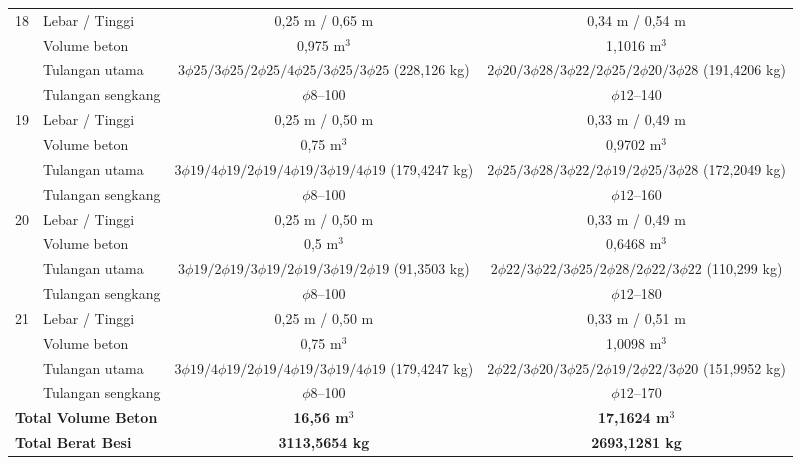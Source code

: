 \begin{landscape}
\begin{longtable}{clcccc}
18 & Lebar / Tinggi & \multicolumn{2}{c}{0,25 m / 0,65 m} & \multicolumn{2}{c}{0,34 m / 0,54 m} \\
   & Volume beton & \multicolumn{2}{c}{0,975 m$^3$} & \multicolumn{2}{c}{1,1016 m$^3$} \\
   & Tulangan utama & \multicolumn{2}{c}{$3\phi25/3\phi25/2\phi25/4\phi25/3\phi25/3\phi25$ (228,126 kg)} & \multicolumn{2}{c}{$2\phi20/3\phi28/3\phi22/2\phi25/2\phi20/3\phi28$ (191,4206 kg)} \\
   & Tulangan sengkang & \multicolumn{2}{c}{$\phi8$--100} & \multicolumn{2}{c}{$\phi12$--140} \\
19 & Lebar / Tinggi & \multicolumn{2}{c}{0,25 m / 0,50 m} & \multicolumn{2}{c}{0,33 m / 0,49 m} \\
   & Volume beton & \multicolumn{2}{c}{0,75 m$^3$} & \multicolumn{2}{c}{0,9702 m$^3$} \\
   & Tulangan utama & \multicolumn{2}{c}{$3\phi19/4\phi19/2\phi19/4\phi19/3\phi19/4\phi19$ (179,4247 kg)} & \multicolumn{2}{c}{$2\phi25/3\phi28/3\phi22/2\phi19/2\phi25/3\phi28$ (172,2049 kg)} \\
   & Tulangan sengkang & \multicolumn{2}{c}{$\phi8$--100} & \multicolumn{2}{c}{$\phi12$--160} \\
20 & Lebar / Tinggi & \multicolumn{2}{c}{0,25 m / 0,50 m} & \multicolumn{2}{c}{0,33 m / 0,49 m} \\
   & Volume beton & \multicolumn{2}{c}{0,5 m$^3$} & \multicolumn{2}{c}{0,6468 m$^3$} \\
   & Tulangan utama & \multicolumn{2}{c}{$3\phi19/2\phi19/3\phi19/2\phi19/3\phi19/2\phi19$ (91,3503 kg)} & \multicolumn{2}{c}{$2\phi22/3\phi22/3\phi25/2\phi28/2\phi22/3\phi22$ (110,299 kg)} \\
   & Tulangan sengkang & \multicolumn{2}{c}{$\phi8$--100} & \multicolumn{2}{c}{$\phi12$--180} \\
21 & Lebar / Tinggi & \multicolumn{2}{c}{0,25 m / 0,50 m} & \multicolumn{2}{c}{0,33 m / 0,51 m} \\
   & Volume beton & \multicolumn{2}{c}{0,75 m$^3$} & \multicolumn{2}{c}{1,0098 m$^3$} \\
   & Tulangan utama & \multicolumn{2}{c}{$3\phi19/4\phi19/2\phi19/4\phi19/3\phi19/4\phi19$ (179,4247 kg)} & \multicolumn{2}{c}{$2\phi22/3\phi20/3\phi25/2\phi19/2\phi22/3\phi20$ (151,9952 kg)} \\
   & Tulangan sengkang & \multicolumn{2}{c}{$\phi8$--100} & \multicolumn{2}{c}{$\phi12$--170} \\
\midrule
\multicolumn{2}{l}{\textbf{Total Volume Beton}} & \multicolumn{2}{c}{\textbf{16,56 m$^3$}} & \multicolumn{2}{c}{\textbf{17,1624 m$^3$}} \\
\multicolumn{2}{l}{\textbf{Total Berat Besi}} & \multicolumn{2}{c}{\textbf{3113,5654 kg}} & \multicolumn{2}{c}{\textbf{2693,1281 kg}} \\
\end{longtable}
\endgroup
\end{landscape}

